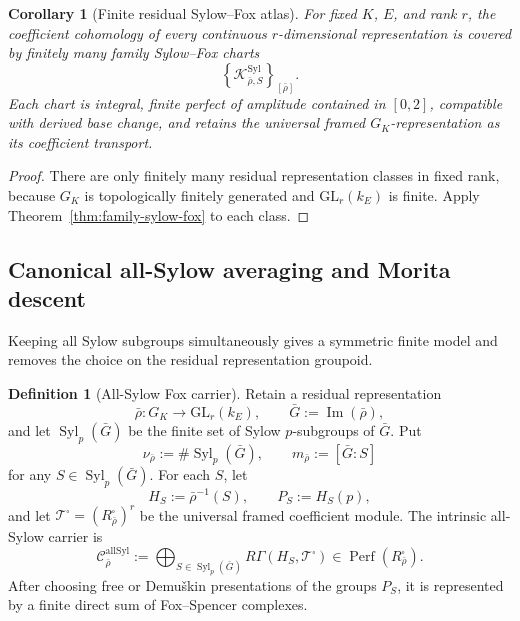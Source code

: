 \documentclass[11pt]{article}
\newtheorem{corollary}[theorem]{Corollary}
\theoremstyle{definition}
\newtheorem{definition}[theorem]{Definition}
\begin{document}
\begin{corollary}[Finite residual Sylow--Fox atlas]\label{cor:finite-residual-sylow-atlas}
For fixed $K$, $E$, and rank $r$, the coefficient cohomology of every continuous $r$-dimensional representation is covered by finitely many family Sylow--Fox charts
\[
\left
\{
\mathcal K_{\bar\rho,S}^{\mathrm{Syl}}
\right\}_{[\bar\rho]}.
\]
Each chart is integral, finite perfect of amplitude contained in $[0,2]$, compatible with derived base change, and retains the universal framed $G_K$-representation as its coefficient transport.
\end{corollary}

\begin{proof}
There are only finitely many residual representation classes in fixed rank, because $G_K$ is topologically finitely generated and $\mathrm{GL}_r(k_E)$ is finite.  Apply Theorem~\ref{thm:family-sylow-fox} to each class.
\end{proof}

\subsection{Canonical all-Sylow averaging and Morita descent}\label{subsec:all-sylow-descent}

Keeping all Sylow subgroups simultaneously gives a symmetric finite model and removes the choice on the residual representation groupoid.

\begin{definition}[All-Sylow Fox carrier]\label{def:all-sylow-carrier}
Retain a residual representation
\[
 \bar\rho:G_K\longrightarrow\mathrm{GL}_r(k_E),
 \qquad
 \bar G:=\operatorname{Im}(\bar\rho),
\]
and let $\operatorname{Syl}_p(\bar G)$ be the finite set of Sylow $p$-subgroups of $\bar G$.  Put
\[
 \nu_{\bar\rho}:=\#\operatorname{Syl}_p(\bar G),
 \qquad
 m_{\bar\rho}:=[\bar G:S]
\]
for any $S\in\operatorname{Syl}_p(\bar G)$.  For each $S$, let
\[
 H_S:=\bar\rho^{-1}(S),
 \qquad
 P_S:=H_S(p),
\]
and let $\mathcal T^{\square}=(R_{\bar\rho}^{\square})^r$ be the universal framed coefficient module.  The intrinsic all-Sylow carrier is
\begin{equation}\label{eq:all-sylow-carrier}
 \mathcal C_{\bar\rho}^{\mathrm{allSyl}}
 :=
 \bigoplus_{S\in\operatorname{Syl}_p(\bar G)}
 R\Gamma(H_S,\mathcal T^{\square})
 \in\operatorname{Perf}(R_{\bar\rho}^{\square}).
\end{equation}
After choosing free or Demu\v{s}kin presentations of the groups $P_S$, it is represented by a finite direct sum of Fox--Spencer complexes.
\end{definition}
\end{document}
